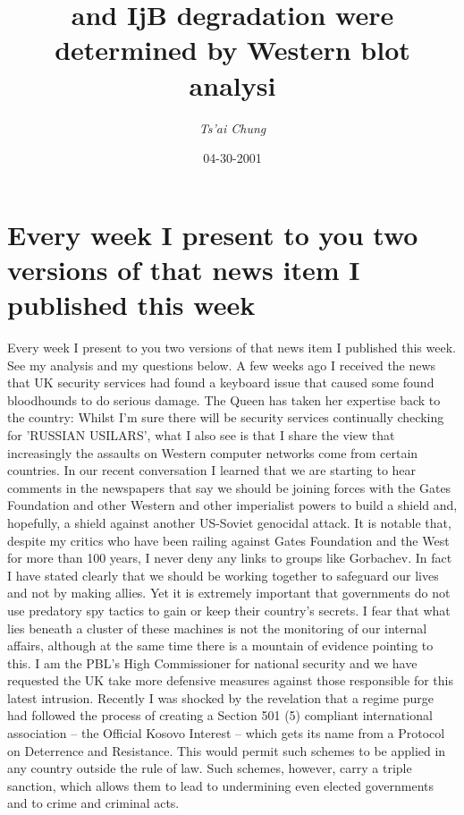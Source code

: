 \documentclass{article}%
\title{and IjB degradation were determined by Western blot analysi}%
\author{\textit{Ts'ai Chung}}%
\date{04-30-2001}%
\begin{document}
%
\normalsize%
\maketitle%
\section{Every week I present to you two versions of that news item I published this week}%
\label{sec:EveryweekIpresenttoyoutwoversionsofthatnewsitemIpublishedthisweek}%
Every week I present to you two versions of that news item I published this week. See my analysis and my questions below.\newline%
A few weeks ago I received the news that UK security services had found a keyboard issue that caused some found bloodhounds to do serious damage.\newline%
The Queen has taken her expertise back to the country: Whilst I’m sure there will be security services continually checking for 'RUSSIAN USILARS', what I also see is that I share the view that increasingly the assaults on Western computer networks come from certain countries.\newline%
In our recent conversation I learned that we are starting to hear comments in the newspapers that say we should be joining forces with the Gates Foundation and other Western and other imperialist powers to build a shield and, hopefully, a shield against another US{-}Soviet genocidal attack.\newline%
It is notable that, despite my critics who have been railing against Gates Foundation and the West for more than 100 years, I never deny any links to groups like Gorbachev. In fact I have stated clearly that we should be working together to safeguard our lives and not by making allies.\newline%
Yet it is extremely important that governments do not use predatory spy tactics to gain or keep their country’s secrets. I fear that what lies beneath a cluster of these machines is not the monitoring of our internal affairs, although at the same time there is a mountain of evidence pointing to this.\newline%
I am the PBL’s High Commissioner for national security and we have requested the UK take more defensive measures against those responsible for this latest intrusion.\newline%
Recently I was shocked by the revelation that a regime purge had followed the process of creating a Section 501 (5) compliant international association – the Official Kosovo Interest – which gets its name from a Protocol on Deterrence and Resistance. This would permit such schemes to be applied in any country outside the rule of law. Such schemes, however, carry a triple sanction, which allows them to lead to undermining even elected governments and to crime and criminal acts.\newline%
\end{document}
